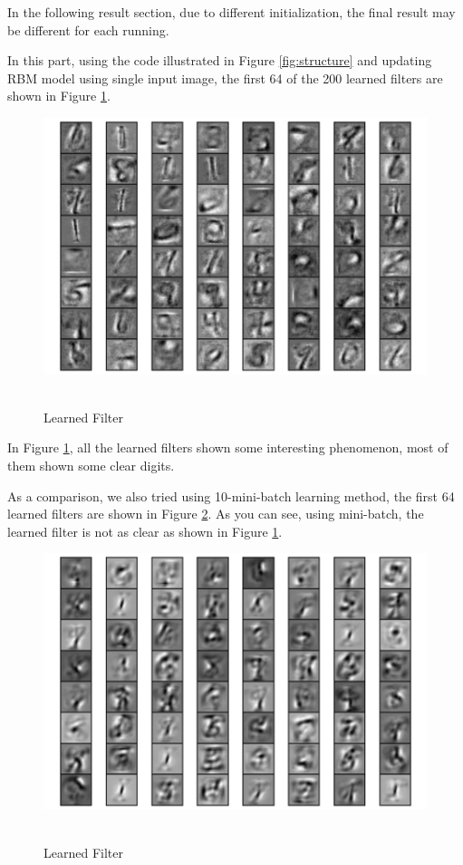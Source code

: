  In the following result section, due to different initialization, the final result may be different for each running.

In this part, using the code illustrated in Figure \ref{fig:structure} and updating RBM model using single input image, the first 64 of the 200 learned filters are shown in Figure \ref{fig:single_filter}.

\begin{figure}[H]
\centering
\includegraphics[width=1.0\textwidth]{./figures/filter.pdf}\
\caption{\label{fig:single_filter} Learned Filter}
\end{figure}

In Figure \ref{fig:single_filter}, all the learned filters shown some interesting phenomenon, most of them shown some clear digits. 

As a comparison, we also tried using 10-mini-batch learning method, the first 64 learned filters are shown in Figure \ref{fig:batch_filter}. As you can see, using mini-batch, the learned filter is not as clear as shown in Figure \ref{fig:single_filter}.

\begin{figure}[H]
\centering
\includegraphics[width=1.0\textwidth]{./figures/filter_batch.pdf}\
\caption{\label{fig:batch_filter} Learned Filter}
\end{figure}

